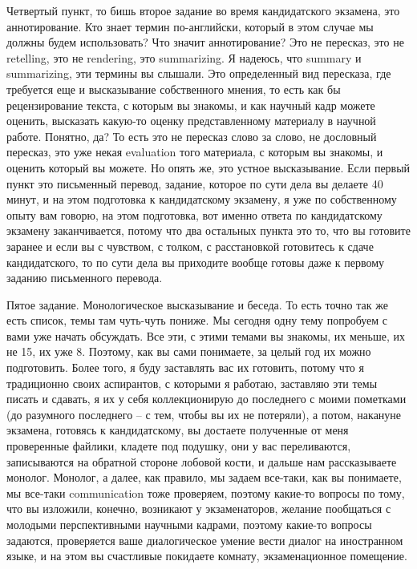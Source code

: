 \documentclass[main.tex]{subfiles}
\begin{document}
Четвертый пункт, то бишь второе задание во время кандидатского экзамена, это аннотирование.
Кто знает термин по-английски, который в этом случае мы должны будем использовать?
Что значит аннотирование?
Это не пересказ, это не retelling, это не rendering, это summarizing.
Я надеюсь, что summary и summarizing, эти термины вы слышали.
Это определенный вид пересказа, где требуется еще и высказывание собственного мнения, то есть как бы рецензирование текста, с которым вы знакомы, и как научный кадр можете оценить, высказать какую-то оценку представленному материалу в научной работе.
Понятно, да?
То есть это не пересказ слово за слово, не дословный пересказ, это уже некая evaluation того материала, с которым вы знакомы, и оценить который вы можете.
Но опять же, это устное высказывание.
Если первый пункт это письменный перевод, задание, которое по сути дела вы делаете 40 минут, и на этом подготовка к кандидатскому экзамену, я уже по собственному опыту вам говорю, на этом подготовка, вот именно ответа по кандидатскому экзамену заканчивается, потому что два остальных пункта это то, что вы готовите заранее и если вы с чувством, с толком, с расстановкой готовитесь к сдаче кандидатского, то по сути дела вы приходите вообще готовы даже к первому заданию письменного перевода.

Пятое задание.
Монологическое высказывание и беседа.
То есть точно так же есть список, темы там чуть-чуть пониже.
Мы сегодня одну тему попробуем с вами уже начать обсуждать.
Все эти, с этими темами вы знакомы, их меньше, их не 15, их уже 8.
Поэтому, как вы сами понимаете, за целый год их можно подготовить.
Более того, я буду заставлять вас их готовить, потому что я традиционно своих аспирантов, с которыми я работаю, заставляю эти темы писать и сдавать, я их у себя коллекционирую до последнего с моими пометками (до разумного последнего -- с тем, чтобы вы их не потеряли), а потом, накануне экзамена, готовясь к кандидатскому, вы достаете полученные от меня проверенные файлики, кладете под подушку, они у вас переливаются, записываются на обратной стороне лобовой кости, и дальше нам рассказываете монолог.
Монолог, а далее, как правило, мы задаем все-таки, как вы понимаете, мы все-таки communication тоже проверяем, поэтому какие-то вопросы по тому, что вы изложили, конечно, возникают у экзаменаторов, желание пообщаться с молодыми перспективными научными кадрами, поэтому какие-то вопросы задаются, проверяется ваше диалогическое умение вести диалог на иностранном языке, и на этом вы счастливые покидаете комнату, экзаменационное помещение.
\end{document}
